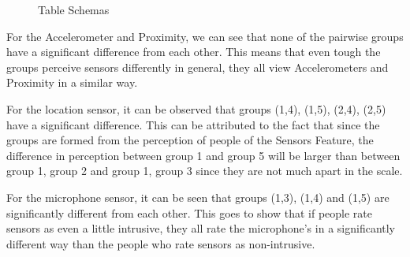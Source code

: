 \begin{figure}[htp]
\hspace{1em}
\caption{Table Schemas}
\label{fig:st3}
\end{figure}



For the Accelerometer and Proximity, we can see that none of the pairwise groups have a significant difference from each other. This means that even tough the groups perceive sensors differently in general, they all view Accelerometers and Proximity in a similar way. 

For the location sensor, it can be observed that groups (1,4), (1,5), (2,4), (2,5) have a significant difference. This can be attributed to the fact that since the groups are formed from the perception of people of the Sensors Feature, the difference in perception between group 1 and group 5 will be larger than between group 1, group 2 and group 1, group 3 since they are not much apart in the scale.

For the microphone sensor, it can be seen that groups (1,3), (1,4) and (1,5) are significantly different from each other. This goes to show that
if people rate sensors as even a little intrusive, they all rate the microphone's in a significantly different way than the people who rate sensors as non-intrusive.

